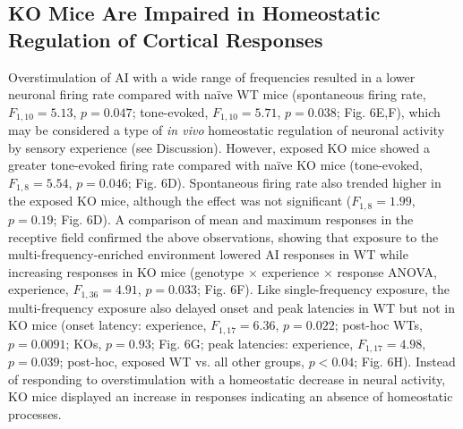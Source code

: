 \subsection{KO Mice Are Impaired in Homeostatic Regulation of Cortical Responses}

Overstimulation of AI with a wide range of frequencies resulted in a lower neuronal firing rate compared with na\"ive WT mice (spontaneous firing rate, $F_{1,10}=5.13$, $p=0.047$; tone-evoked, $F_{1,10}=5.71$, $p=0.038$; Fig. 6E,F), which may be considered a type of \textit{in vivo} homeostatic regulation of neuronal activity by sensory experience (see Discussion). However, exposed KO mice showed a greater tone-evoked firing rate compared with na\"ive KO mice (tone-evoked, $F_{1,8}=5.54$, $p=0.046$; Fig. 6D). Spontaneous firing rate also trended higher in the exposed KO mice, although the effect was not significant ($F_{1,8}=1.99$, $p=0.19$; Fig. 6D). A comparison of mean and maximum responses in the receptive field confirmed the above observations, showing that exposure to the multi-frequency-enriched environment lowered AI responses in WT while increasing responses in KO mice (genotype $\times$ experience $\times$ response ANOVA, experience, $F_{1,36}=4.91$, $p=0.033$; Fig. 6F). Like single-frequency exposure, the multi-frequency exposure also delayed onset and peak latencies in WT but not in KO mice (onset latency: experience, $F_{1,17}=6.36$, $p=0.022$; post-hoc WTs, $p=0.0091$; KOs, $p=0.93$; Fig. 6G; peak latencies: experience, $F_{1,17}=4.98$, $p=0.039$; post-hoc, exposed WT vs. all other groups, $p<0.04$; Fig. 6H). Instead of responding to overstimulation with a homeostatic decrease in neural activity, KO mice displayed an increase in responses indicating an absence of homeostatic processes.

